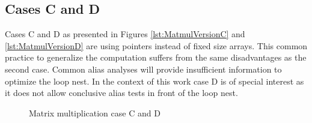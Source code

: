 \subsection*{Cases C and D} 
Cases C and D as presented in Figures \ref{lst:MatmulVersionC} and 
\ref{lst:MatmulVersionD} are using pointers instead of fixed size arrays. 
This common practice to generalize the computation suffers from the same 
disadvantages as the second case. Common alias analyses will provide insufficient
information to optimize the loop nest. In the context of this work case D is 
of special interest as it does not allow conclusive alias tests in front of the
loop nest.  

\clearpage
\begin{figure}[htpb]
  \centering
  \hfill
  \caption{Matrix multiplication case C and D}
   \label{lst:MatmulVersionCD}
\end{figure}


